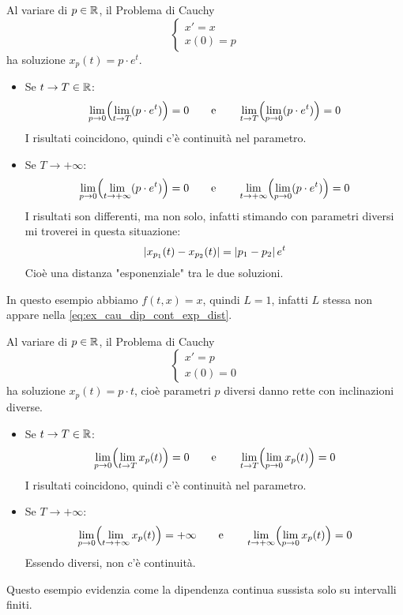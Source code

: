 \begin{example}
	Al variare di $p \in \mathbb{R}$, il Problema di Cauchy
	\begin{equation*}
		\begin{cases}
			x' = x\\
			x(0) = p
		\end{cases}
	\end{equation*}
	ha soluzione $x_p(t) = p \cdot e^t$.
	\begin{itemize}
		\item Se $t \to T \in \mathbb{R}$:
		\[\lim_{p \to 0}\Bigl(\lim_{t \to T} (p \cdot e^t)\Bigr) = 0 \qquad\text{e}\qquad \lim_{t \to T}\Bigl(\lim_{p \to 0} (p \cdot e^t)\Bigr) = 0\]
		I risultati coincidono, quindi c'è continuità nel parametro.
		\item Se $T \to +\infty$:
		\[\lim_{p \to 0}\Bigl(\lim_{t \to +\infty} (p \cdot e^t)\Bigr) = 0 \qquad\text{e}\qquad \lim_{t \to +\infty}\Bigl(\lim_{p \to 0} (p \cdot e^t)\Bigr) = 0\]
		I risultati son differenti, ma non solo, infatti stimando con parametri diversi mi troverei in questa situazione:
		\begin{equation}
			\label{eq:ex_cau_dip_cont_exp_dist}
			\left|x_{p_1}(t) - x_{p_2}(t)\right| = \left|p_1-p_2\right|e^t
		\end{equation}
		Cioè una distanza "esponenziale" tra le due soluzioni.
	\end{itemize}
	\begin{note}
		In questo esempio abbiamo $f(t,x) = x$, quindi $L = 1$, infatti $L$ stessa non appare nella \cref{eq:ex_cau_dip_cont_exp_dist}.
	\end{note}
\end{example}
\begin{example}
	Al variare di $p \in \mathbb{R}$, il Problema di Cauchy
	\begin{equation*}
		\begin{cases}
			x' = p\\
			x(0) = 0
		\end{cases}
	\end{equation*}
	ha soluzione $x_p(t) = p \cdot t$, cioè parametri $p$ diversi danno rette con inclinazioni diverse.
	\begin{itemize}
		\item Se $t \to T \in \mathbb{R}$:
		\[\lim_{p \to 0}\Bigl(\lim_{t \to T} x_p(t)\Bigr)=0 \qquad\text{e}\qquad \lim_{t \to T}\Bigl(\lim_{p \to 0} x_p(t)\Bigr)=0\]
		I risultati coincidono, quindi c'è continuità nel parametro.
		\item Se $T \to +\infty$:
		\[\lim_{p \to 0}\Bigl(\lim_{t \to +\infty} x_p(t)\Bigr)=+\infty \qquad\text{e}\qquad \lim_{t \to +\infty}\Bigl(\lim_{p \to 0} x_p(t)\Bigr)=0\]
		Essendo diversi, non c'è continuità.
	\end{itemize}
	\begin{note}
		Questo esempio evidenzia come la dipendenza continua sussista solo su intervalli finiti.
	\end{note}
\end{example}

